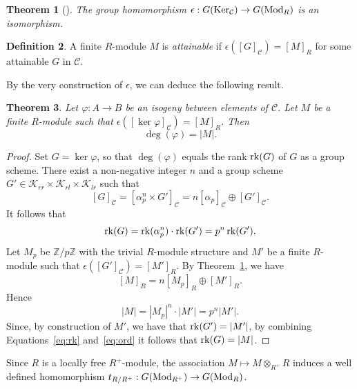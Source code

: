 \documentclass[11pt]{amsart}
\newcommand\Z{\mathbb{Z}}
\def\rk{\mathop{\rm rk}\nolimits}
\def\Mod{\mathop{\rm Mod}\nolimits}
\def\KerC{\mathop{\rm Ker_\mathcal{C}}\nolimits}
\newcommand\cC{\mathcal{C}}
\theoremstyle{plain}
\newtheorem{theorem}{Theorem}[section]
\theoremstyle{definition}
\newtheorem{definition}[theorem]{Definition}
\begin{document}
\begin{theorem}[{\cite[Thm.~3.5]{Howe96}}]\label{thm:howe_isom}
    The group homomorphism $\epsilon : G(\KerC) \to G(\Mod_R)$ is an isomorphism.
\end{theorem}

\begin{definition}
    A finite $R$-module $M$ is \emph{attainable} if $\epsilon([G]_\cC) = [M]_R$ for some attainable $G$ in $\cC$.
\end{definition}

By the very construction of $\epsilon$, we can deduce the following result.
\begin{theorem}\label{thm:deg_ord}
    Let $\varphi:A\to B$ be an isogeny between elements of $\cC$.
    Let $M$ be a finite $R$-module such that $\epsilon([\ker \varphi]_\cC) = [M]_R$.
    Then
    \[ \deg(\varphi) = |M|. \]
\end{theorem}
\begin{proof}
    Set $G = \ker\varphi$, so that $\deg(\varphi)$ equals the rank $\rk(G)$ of $G$ as a group scheme.
    There exist a non-negative integer $n$ and a group scheme $G' \in \mathcal{K}_{rr}\times \mathcal{K}_{rl} \times \mathcal{K}_{lr}$ such that
    \[ [G]_\cC = [ \alpha_p^n \times G' ]_\cC = n[ \alpha_p ]_\cC \oplus [ G' ]_\cC. \]
    It follows that
    \begin{equation}\label{eq:rk}
        \rk(G) =\rk(\alpha_p^n)\cdot \rk(G') = p^n\rk(G').
    \end{equation}
    Let $M_p$ be $\Z/p \Z$ with the trivial $R$-module structure and $M'$ be a finite $R$-module such that $\epsilon([G']_\cC) = [M']_R$.
    By Theorem~\ref{thm:howe_isom}, we have
    \[ [M]_R = n[M_p]_R \oplus [M']_R. \]
    Hence
    \begin{equation}\label{eq:ord}
        |M| = |M_p|^n \cdot |M'| = p^n|M'|.
    \end{equation}
    Since, by construction of $M'$, we have that $\rk(G')=|M'|$, by combining Equations~\eqref{eq:rk} and~\eqref{eq:ord}  it follows that $\rk(G)=|M|$.
\end{proof}

Since $R$ is a locally free $R^+$-module, the association $M \mapsto M \otimes_{R^+} R$ induces a well defined homomorphism $t_{R/R^+}:G(\Mod_{R^+})\to G(\Mod_R)$.
\end{document}
